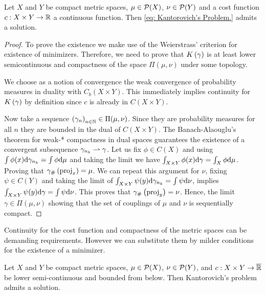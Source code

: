 \begin{theorem} Let $X$ and $Y$ be compact metric spaces, $\mu \in \mathcal{P}(X)$, $\nu \in \mathcal{P}(Y)$ and a cost function $c: X\times Y \rightarrow \mathbb{R}$ a continuous function. Then \eqref{eq: Kantorovich's Problem.} admits a solution.
\end{theorem}
\begin{proof}
	To prove the existence we make use of the Weierstrass’ criterion for existence of minimizers. Therefore, we need to prove that $K\left(\gamma\right)$ is at least lower semicontinuous and compactness of the space $\Pi(\mu, \nu)$ under some topology. 
	
	We choose as a notion of convergence the weak convergence of probability measures in duality with $C_b(X\times Y)$. This immediately implies continuity for $K\left(\gamma\right)$ by definition since $c$ is already in $C(X\times Y)$. 
	
	Now take a sequence $\left( \gamma_n \right)_{n\in\mathbb{N}} \in \Pi(\mu, \nu)$. Since they are probability measures for all $n$ they are bounded in the dual of $C(X\times Y)$. The Banach-Alaouglu's theorem for weak-* compactness in dual spaces guarantees the existence of a convergent subsequence $\gamma_{n_k} \rightharpoonup \gamma$. Let us fix $\phi \in C(X)$ and using $\int\phi(x) \mathrm{d} \gamma_{n_k}=\int \phi \mathrm{d}\mu$ and taking the limit we have $\int_{X\times Y}\phi(x) \mathrm{d} \gamma=\int_{X} \phi \mathrm{d}\mu$. Proving that ${\gamma}_{\#} \left( \mathrm{proj}_x \right)=\mu$. We can repeat this argument for $\nu$, fixing $\psi \in C(Y)$ and taking the limit of $\int_{X\times Y} \psi(y) \mathrm{d} \gamma_{n_k}=\int \psi \mathrm{d}\nu$, implies $\int_{X\times Y} \psi(y) \mathrm{d} \gamma=\int \psi \mathrm{d}\nu$. This proves that ${\gamma}_{\#} \left( \mathrm{proj}_y \right)=\nu$. Hence, the limit $\gamma \in \Pi(\mu, \nu)$ showing that the set of couplings of $\mu$ and $\nu$ is sequentially compact. 
\end{proof}

Continuity for the cost function and compactness of the metric spaces can be demanding requirements. However we can substitute them by milder conditions for the existence of a minimizer.

\begin{theorem}
	Let $X$ and $Y$ be compact metric spaces, $\mu \in \mathcal{P}(X)$, $\nu \in\mathcal{P}(Y)$, and $c:X\times Y\rightarrow \overline{\mathbb{R}} $  be lower semi-continuous and bounded from below. Then Kantorovich's problem admits a solution.
\end{theorem}

